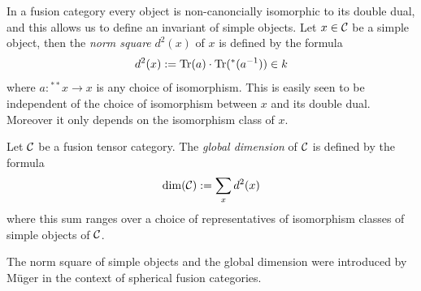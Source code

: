 \documentclass{amsart}
\begin{document}
In a fusion category every object is non-canoncially isomorphic to its double dual, and this allows us to define an invariant of simple objects. Let $x \in \mathcal C$ be a simple object, then the {\em norm square} $d^2(x)$ of $x$ is defined by the formula 
\begin{equation*}
	d^2(x) := \mathrm{Tr}(a) \cdot \mathrm{Tr}({}^*(a^{-1})) \in k
\end{equation*}
where $a: {}^{**}x \to x$ is any choice of isomorphism. This is easily seen to be independent of the choice of isomorphism between $x$ and its double dual. Moreover it only depends on the isomorphism class of $x$. 
\begin{definition}
	Let $\mathcal C$ be a fusion tensor category. The {\em global dimension} of $\mathcal C$ is defined by the formula
	\begin{equation*}
		\dim(\mathcal C) := \sum_{x} d^2(x)
	\end{equation*}
	where this sum ranges over a choice of representatives of isomorphism classes of simple objects of $\mathcal C$. 
\end{definition}
\noindent The norm square of simple objects and the global dimension were introduced by M\"uger \cite{MR1966524} in the context of spherical fusion categories.



\end{document}
